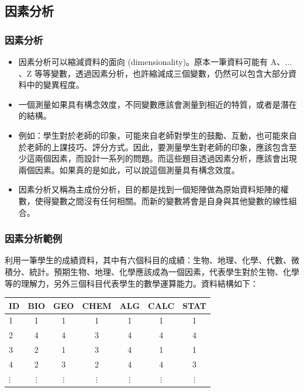\documentclass[xcolor=dvipsnames, 13pt]{beamer}
\begin{document}
\subsection{因素分析}
\begin{frame}\frametitle{因素分析}
\begin{itemize}
\item 因素分析可以縮減資料的面向 (dimensionality)。原本一筆資料可能有 A、$\dots$、Z 等等變數，透過因素分析，也許縮減成三個變數，仍然可以包含大部分資料中的變異程度。
\item 一個測量如果具有構念效度，不同變數應該會測量到相近的特質，或者是潛在的結構。
\item 例如：學生對於老師的印象，可能來自老師對學生的鼓勵、互動，也可能來自於老師的上課技巧、評分方式。因此，要測量學生對老師的印象，應該包含至少這兩個因素，而設計一系列的問題。而這些題目透過因素分析，應該會出現兩個因素。如果真的是如此，可以說這個測量具有構念效度。
\item 因素分析又稱為主成份分析，目的都是找到一個矩陣做為原始資料矩陣的權數，使得變數之間沒有任何相關。而新的變數將會是自身與其他變數的線性組合。
\end{itemize}
\end{frame}
\begin{frame}\frametitle{因素分析範例}
利用一筆學生的成績資料，其中有六個科目的成績：生物、地理、化學、代數、微積分、統計。預期生物、地理、化學應該成為一個因素，代表學生對於生物、化學等的理解力，另外三個科目代表學生的數學運算能力。資料結構如下：
\begin{table}
\begin{tabular}{l | c c c c c c}
\hline
ID   &  BIO & GEO & CHEM & ALG & CALC & STAT \\
 \hline
 1 & 1 & 1 & 1 & 1 & 1 & 1  \\ 
 2 & 4 & 4 & 3 & 4 & 4 & 4  \\
 3 & 2 & 1 & 3 & 4 & 1 & 1  \\  
 4 & 2 & 3 & 2 & 4 & 4 & 3  \\
 $\vdots$  & $\vdots$  & $ \vdots$  & $\vdots$  & $\vdots$  & $\vdots$  & $\vdots$    \\
 \end{tabular}
\end{table}
\end{frame}
\end{document}
